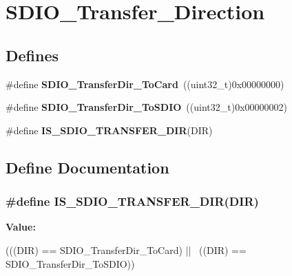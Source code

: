 \hypertarget{group__SDIO__Transfer__Direction}{
\section{SDIO\_\-Transfer\_\-Direction}
\label{group__SDIO__Transfer__Direction}
}
\subsection*{Defines}
\begin{DoxyCompactItemize}
\item 
\hypertarget{group__SDIO__Transfer__Direction_gaef8af0ffa4ea04b3362338d268cc0935}{
\#define {\bfseries SDIO\_\-TransferDir\_\-ToCard}~((uint32\_\-t)0x00000000)}
\label{group__SDIO__Transfer__Direction_gaef8af0ffa4ea04b3362338d268cc0935}

\item 
\hypertarget{group__SDIO__Transfer__Direction_ga55a6d9613d3e2e7762296b45d0d13222}{
\#define {\bfseries SDIO\_\-TransferDir\_\-ToSDIO}~((uint32\_\-t)0x00000002)}
\label{group__SDIO__Transfer__Direction_ga55a6d9613d3e2e7762296b45d0d13222}

\item 
\#define {\bfseries IS\_\-SDIO\_\-TRANSFER\_\-DIR}(DIR)
\end{DoxyCompactItemize}


\subsection{Define Documentation}
\hypertarget{group__SDIO__Transfer__Direction_gaf84b8004cfef6a5a525b20db8a83c2f7}{
\subsubsection[{IS\_\-SDIO\_\-TRANSFER\_\-DIR}]{\setlength{\rightskip}{0pt plus 5cm}\#define IS\_\-SDIO\_\-TRANSFER\_\-DIR(DIR)}}
\label{group__SDIO__Transfer__Direction_gaf84b8004cfef6a5a525b20db8a83c2f7}
{\bfseries Value:}
\begin{DoxyCode}
(((DIR) == SDIO_TransferDir_ToCard) || \
                                   ((DIR) == SDIO_TransferDir_ToSDIO))
\end{DoxyCode}
